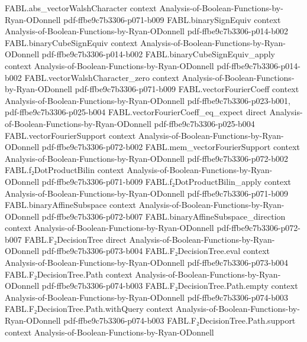 \begin{theorem}
\proofstep
  {FABL.abs_vectorWalshCharacter}
  {context}
  {Analysis-of-Boolean-Functions-by-Ryan-ODonnell}
  {pdf-ffbe9c7b3306-p071-b009}
\proofstep
  {FABL.binarySignEquiv}
  {context}
  {Analysis-of-Boolean-Functions-by-Ryan-ODonnell}
  {pdf-ffbe9c7b3306-p014-b002}
\proofstep
  {FABL.binaryCubeSignEquiv}
  {context}
  {Analysis-of-Boolean-Functions-by-Ryan-ODonnell}
  {pdf-ffbe9c7b3306-p014-b002}
\proofstep
  {FABL.binaryCubeSignEquiv_apply}
  {context}
  {Analysis-of-Boolean-Functions-by-Ryan-ODonnell}
  {pdf-ffbe9c7b3306-p014-b002}
\proofstep
  {FABL.vectorWalshCharacter_zero}
  {context}
  {Analysis-of-Boolean-Functions-by-Ryan-ODonnell}
  {pdf-ffbe9c7b3306-p071-b009}
\proofstep
  {FABL.vectorFourierCoeff}
  {context}
  {Analysis-of-Boolean-Functions-by-Ryan-ODonnell}
  {pdf-ffbe9c7b3306-p023-b001,
    pdf-ffbe9c7b3306-p025-b004}
\proofstep
  {FABL.vectorFourierCoeff_eq_expect}
  {direct}
  {Analysis-of-Boolean-Functions-by-Ryan-ODonnell}
  {pdf-ffbe9c7b3306-p025-b004}
\proofstep
  {FABL.vectorFourierSupport}
  {context}
  {Analysis-of-Boolean-Functions-by-Ryan-ODonnell}
  {pdf-ffbe9c7b3306-p072-b002}
\proofstep
  {FABL.mem_vectorFourierSupport}
  {context}
  {Analysis-of-Boolean-Functions-by-Ryan-ODonnell}
  {pdf-ffbe9c7b3306-p072-b002}
\proofstep
  {FABL.f₂DotProductBilin}
  {context}
  {Analysis-of-Boolean-Functions-by-Ryan-ODonnell}
  {pdf-ffbe9c7b3306-p071-b009}
\proofstep
  {FABL.f₂DotProductBilin_apply}
  {context}
  {Analysis-of-Boolean-Functions-by-Ryan-ODonnell}
  {pdf-ffbe9c7b3306-p071-b009}
\proofstep
  {FABL.binaryAffineSubspace}
  {context}
  {Analysis-of-Boolean-Functions-by-Ryan-ODonnell}
  {pdf-ffbe9c7b3306-p072-b007}
\proofstep
  {FABL.binaryAffineSubspace_direction}
  {context}
  {Analysis-of-Boolean-Functions-by-Ryan-ODonnell}
  {pdf-ffbe9c7b3306-p072-b007}
\proofstep
  {FABL.F₂DecisionTree}
  {direct}
  {Analysis-of-Boolean-Functions-by-Ryan-ODonnell}
  {pdf-ffbe9c7b3306-p073-b004}
\proofstep
  {FABL.F₂DecisionTree.eval}
  {context}
  {Analysis-of-Boolean-Functions-by-Ryan-ODonnell}
  {pdf-ffbe9c7b3306-p073-b004}
\proofstep
  {FABL.F₂DecisionTree.Path}
  {context}
  {Analysis-of-Boolean-Functions-by-Ryan-ODonnell}
  {pdf-ffbe9c7b3306-p074-b003}
\proofstep
  {FABL.F₂DecisionTree.Path.empty}
  {context}
  {Analysis-of-Boolean-Functions-by-Ryan-ODonnell}
  {pdf-ffbe9c7b3306-p074-b003}
\proofstep
  {FABL.F₂DecisionTree.Path.withQuery}
  {context}
  {Analysis-of-Boolean-Functions-by-Ryan-ODonnell}
  {pdf-ffbe9c7b3306-p074-b003}
\proofstep
  {FABL.F₂DecisionTree.Path.support}
  {context}
  {Analysis-of-Boolean-Functions-by-Ryan-ODonnell}

\end{theorem}

